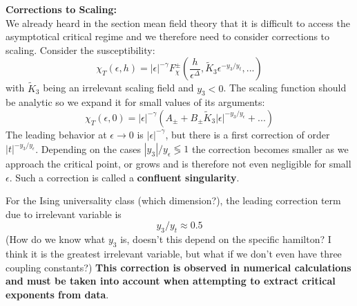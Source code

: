	\textbf{Corrections to Scaling:} \\
	We already heard in the section mean field theory that it is difficult to access the asymptotical critical regime and we therefore need to consider corrections to scaling. Consider the susceptibility:
	\begin{equation}
		\chi_T(\epsilon, h) = |\epsilon|^{-\gamma} F_\chi^{\pm} \left(\frac{h}{\epsilon^\Delta} , \tilde{K}_3 \epsilon^{-y_3 / y_t}, ... \right)
	\end{equation}
	with $\tilde{K}_3$ being an irrelevant scaling field and $y_3 < 0$. The scaling function should be analytic so we expand it for small values of its arguments:
	\begin{equation}
		\chi_T(\epsilon, 0) =	|\epsilon|^{-\gamma} \left(A_\pm + B_\pm \tilde{K}_3 |\epsilon|^{-y_3 /	y_\epsilon} + ... \right)
	\end{equation}
	The leading behavior at $\epsilon \rightarrow 0$ is $|\epsilon|^{-\gamma}$, but there is a first correction of order $|t|^{-y_3 / y_\epsilon}$. Depending on the cases $|y_3| / y_\epsilon \lessgtr 1$ the correction becomes smaller as we approach the critical point, or grows and is therefore not even negligible for small $\epsilon$. Such a correction is called a \textbf{confluent singularity}.
	
	For the Ising universality class (which dimension?), the leading correction term due to irrelevant variable is
	\begin{equation}
		y_3 / y_t \approx 0.5
	\end{equation}
	(How do we know what $y_3$ is, doesn't this depend on the specific hamilton? I think it is the greatest irrelevant variable, but what if we don't even have three coupling constants?) \textbf{This correction is observed in numerical calculations and must be taken into account when attempting to extract critical exponents from data}.
	
